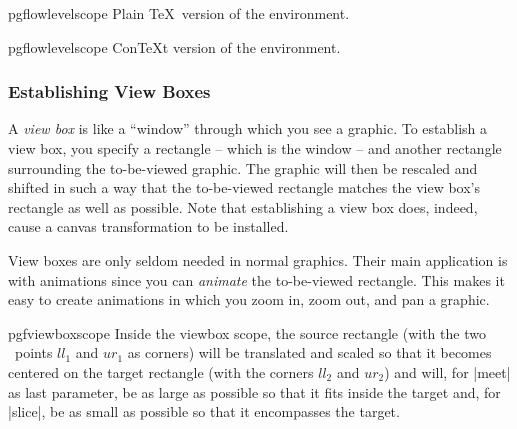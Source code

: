 \begin{plainenvironment}{{pgflowlevelscope}}
  Plain \TeX\ version of the environment.
\end{plainenvironment}

\begin{contextenvironment}{{pgflowlevelscope}}
  Con\TeX t version of the environment.
\end{contextenvironment}



\subsubsection{Establishing View Boxes}
\label{section-base-view}

A \emph{view box} is like a ``window'' through which you see a
graphic. To establish a view box, you specify a rectangle -- which is
the window -- and another rectangle surrounding the to-be-viewed
graphic. The graphic will then be rescaled and shifted in such a way
that the to-be-viewed rectangle matches the view box's rectangle as
well as possible. Note that establishing a view box does, indeed,
cause a canvas transformation to be installed.

View boxes are only seldom needed in normal graphics. Their main
application is with animations since you can \emph{animate} the
to-be-viewed rectangle. This makes it easy to create animations in
which you zoom in, zoom out, and pan a graphic.

\begin{environment}{{pgfviewboxscope}}
  Inside the viewbox scope, the source rectangle (with the two
  \pgfname\ points $ll_1$ and $ur_1$ as corners) will be translated
  and scaled so that it becomes centered on the target rectangle (with
  the corners $ll_2$ and $ur_2$) and will, for |meet| as last
  parameter, be as large as possible so that it fits inside the target
  and, for |slice|, be as small as possible so that it encompasses the
  target.
\begin{codeexample}[]
\end{codeexample}
\begin{codeexample}[]
\end{codeexample}
\end{environment}

